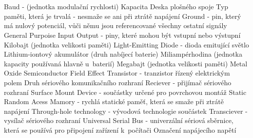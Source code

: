 \cleardoublepage
\chapter*{\listofabbrevname}
{}

\begin{acronym}[MOSFET] %
		{Baud - (jednotka modulační rychlosti)}
		{Kapacita}
		{Deska plošného spoje}
		{Typ paměti, která je trvalá - nesmaže se ani při ztrátě napájení}
		{Ground - pin, který má nulový potenciál, vůči němu jsou referencované všechny ostatní signály}
		{General Purpoise Input Output - piny, které mohou být vstupní nebo výstupní}
		{Kilobajt (jednotka velikosti paměti)}
		{Light-Emitting Diode - dioda emitující světlo}
		{Lithium-iontový akumulátor (druh nabíjecí baterie)}
		{Miliampérhodina (jednotka kapacity používaná hlavně u~baterií)}
		{Megabajt (jednotka velikosti paměti)}
		{Metal Oxide Semiconductor Field Effect Transistor - tranzistor řízený elektrickým polem}	
		{Druh sériového komunikačního rozhraní} 
		{Reciever - přijímač sériového rozhraní}
		{Surface Mount Device - součástky určené pro povrchovou montáž} 
		{Static Random Acess Mamory - rychlá statické paměť, která se smaže při ztrátě napájení}	
		{Through-hole technology - vývodová technologie součástek}
		{Transciever - vysílač sériového rozhraní} 
		{Universal Serial Bus - univerzální sériová sběrnice, která se používá pro připojení zařízení k~počítači}
		{Označení napájecího napětí}

\end{acronym}
